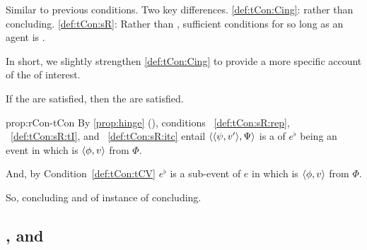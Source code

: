 \begin{note}
  \noindent%
  Similar to previous conditions.
  Two key differences.
  \ref{def:tCon:Cing}: \tCV{} rather than concluding.
  \ref{def:tCon:sR}: Rather than \requ{}, sufficient conditions for \requ{} so long as an agent is \tCV{}.

  In short, we slightly strengthen \ref{def:tCon:Cing} to provide a more specific account of the  of interest.
\end{note}

\begin{note}
  \begin{proposition}
    \label{prop:rCon-tCon}
    If the  are satisfied, then the \rCon{} are satisfied.
  \end{proposition}

  \begin{argument}{prop:rCon-tCon}
    By \autoref{prop:hinge} (), conditions%
        ~\ref{def:tCon:sR:rep},%
        ~\ref{def:tCon:sR:tI}, and%
        ~\ref{def:tCon:sR:itc} entail \(\langle \langle \psi, v' \rangle, \Psi \rangle\) is a \requ{} of \(e^{\flat}\) being an event in which \vAgent{} is \tCV{} \(\langle \phi, v \rangle\) from \(\Phi\).

        And, by Condition~\ref{def:tCon:tCV} \(e^{\flat}\) is a sub-event of \(e\) in which \vAgent{} is \tCV{} \(\langle \phi, v \rangle\) from \(\Phi\).

        So, concluding and \requ{} of instance of concluding.
  \end{argument}
\end{note}


\subsection{, \qWhyV{} and \issueConstraint{}}
\label{sec:tccon2-qwhyv-}


